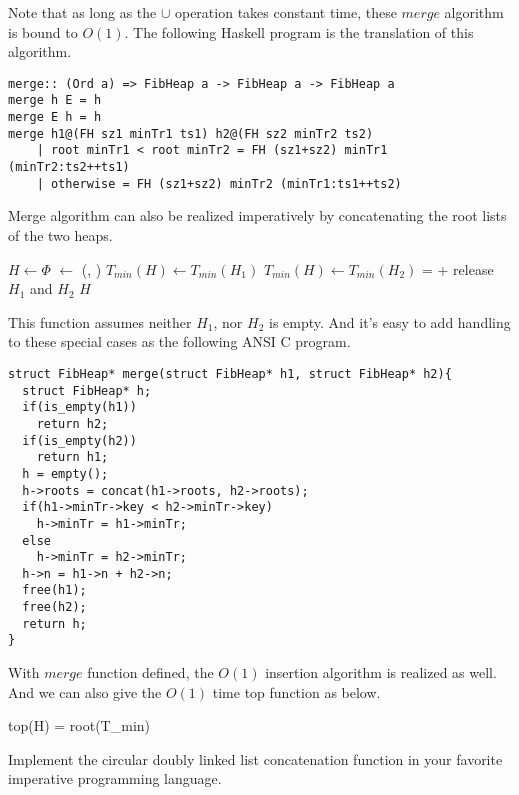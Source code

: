 \documentclass{article}
\begin{document}
Note that as long as the $\cup$ operation takes constant time, these
$merge$ algorithm is bound to $O(1)$. The following Haskell program
is the translation of this algorithm.

\lstset{language=Haskell}
\begin{lstlisting}
merge:: (Ord a) => FibHeap a -> FibHeap a -> FibHeap a
merge h E = h
merge E h = h
merge h1@(FH sz1 minTr1 ts1) h2@(FH sz2 minTr2 ts2) 
    | root minTr1 < root minTr2 = FH (sz1+sz2) minTr1 (minTr2:ts2++ts1)
    | otherwise = FH (sz1+sz2) minTr2 (minTr1:ts1++ts2)
\end{lstlisting}

Merge algorithm can also be realized imperatively by concatenating
the root lists of the two heaps.

\begin{algorithmic}[1]
  \State $H \gets \Phi$
  \State {} $\gets$ (, )
    \State $T_{min}(H) \gets T_{min}(H_1)$
  \Else
    \State $T_{min}(H) \gets T_{min}(H_2)$
  \EndIf
   =  + 
  \State release $H_1$ and $H_2$
  \State \Return $H$
\EndFunction
\end{algorithmic}

This function assumes neither $H_1$, nor $H_2$ is empty. And it's easy
to add handling to these special cases as the following ANSI C program.

\lstset{language=C}
\begin{lstlisting}
struct FibHeap* merge(struct FibHeap* h1, struct FibHeap* h2){
  struct FibHeap* h;
  if(is_empty(h1))
    return h2;
  if(is_empty(h2))
    return h1;
  h = empty();
  h->roots = concat(h1->roots, h2->roots);
  if(h1->minTr->key < h2->minTr->key)
    h->minTr = h1->minTr;
  else
    h->minTr = h2->minTr;
  h->n = h1->n + h2->n;
  free(h1);
  free(h2);
  return h;
}
\end{lstlisting}

With $merge$ function defined, the $O(1)$ insertion algorithm is realized
as well. And we can also give the $O(1)$ time top function as below.

\be
top(H) = root(T_{min})
\ee

\begin{Exercise}
Implement the circular doubly linked list concatenation function in
your favorite imperative programming language.
\end{Exercise}
\end{document}
